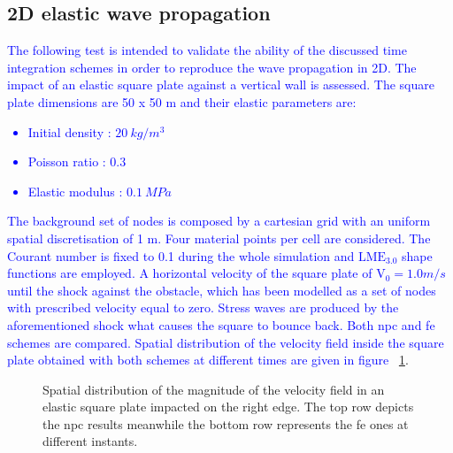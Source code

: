 \documentclass[preprint,12pt,a4paper]{elsarticle}
\begin{document}
\subsection{2D elastic wave propagation}
\label{sec:Velocity-waves-elastic-domain}

\textcolor{blue}{The following test is intended to validate the ability of the discussed time integration schemes in order to reproduce the wave propagation in 2D. The impact of an elastic square plate against a vertical wall is assessed. The square plate dimensions are 50 x 50 m and their elastic parameters are:
\begin{itemize} 
\item  Initial density : $20\ kg/m^3$
\item  Poisson ratio : $0.3$
\item  Elastic modulus : $0.1\ MPa$
\end{itemize}
}
\textcolor{blue}{The background set of nodes is composed by a cartesian grid with an uniform spatial discretisation of 1 m. Four material points per cell are considered. The Courant number is fixed to 0.1 during the whole simulation and $\text{LME}_{3.0}$ shape functions are employed. A horizontal velocity of the square plate of $\text{V}_0 = 1.0 m/s$ until the shock against the obstacle, which has been modelled as a set of nodes with prescribed velocity equal to zero. Stress waves are produced by the aforementioned shock what causes the square to bounce back. Both \acrshort{npc} and \acrshort{fe} schemes are compared. Spatial distribution of the velocity field inside the square plate obtained with both schemes at different times are given in figure ~\ref{fig:Magnitude_velocity_impact_square}}. 
\begin{figure}
  \centering
  \caption{Spatial distribution of the magnitude of the velocity field in an elastic square plate impacted on the right edge. The top row depicts the \acrshort{npc} results meanwhile the bottom row represents the \acrshort{fe} ones at different instants.}
  \label{fig:Magnitude_velocity_impact_square}
\end{figure}
\end{document}
